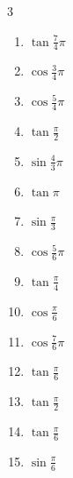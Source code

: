 \begin{multicols}{3}
\begin{enumerate}
  \item $\displaystyle \tan{\frac{7}{4}\pi}$
        \phantom{$\displaystyle =-1$}

  \item $\displaystyle \cos{\frac{3}{4}\pi}$

  \item $\displaystyle \cos{\frac{5}{4}\pi}$

  \item $\displaystyle \tan{\frac{\pi}{2}}$
        \phantom{$\displaystyle \quad なし$}

  \item $\displaystyle \sin{\frac{4}{3}\pi}$

  \item $\displaystyle \tan{\pi}$
        \phantom{$\displaystyle =0$}

  \item $\displaystyle \sin{\frac{\pi}{3}}$

  \item $\displaystyle \cos{\frac{5}{6}\pi}$

  \item $\displaystyle \tan{\frac{\pi}{4}}$
        \phantom{$\displaystyle =1$}

  \item $\displaystyle \cos{\frac{\pi}{6}}$

  \item $\displaystyle \cos{\frac{7}{6}\pi}$

  \item $\displaystyle \tan{\frac{\pi}{6}}$

  \item $\displaystyle \tan{\frac{\pi}{2}}$
        \phantom{$\displaystyle \quad なし$}

  \item $\displaystyle \tan{\frac{\pi}{6}}$

  \item $\displaystyle \sin{\frac{\pi}{6}}$


\end{enumerate}
\end{multicols}
